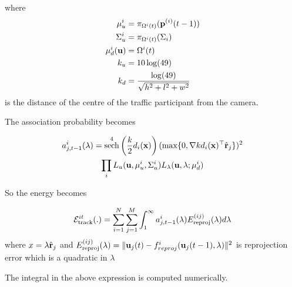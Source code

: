 \documentclass[10pt,twocolumn,letterpaper]{article}
\DeclareMathOperator{\sech}{sech}
\begin{document}
where 
\begin{align}
  \mu_u^i &= \pi_{\Omega^{i}(t)}(\mathbf{p}^{(i)}(t-1)) \\
  \Sigma_u^i &= \pi_{\Omega^{i}(t)}(\Sigma_i)\\
  \mu^i_d(\mathbf{u}) &= \Omega^{i}(t)\\
  k_u &= 10\log(49)\\
  k_d &= \frac{\log(49)}{\sqrt{h^2 + l^2 + w^2}}
  \label{eq:ptransmissionInit}
\end{align}
is the distance of the centre of the traffic participant from the camera.


The association probability becomes

\newcommand{\Lu}{L_u(\mathbf{u}, \mu^i_u,\Sigma^i_u)}
\newcommand{\Llambda}{L_{\lambda}(\mathbf{u}, \lambda; \mu^i_d)}
\begin{multline}
  \assocP = 
    \sech^4\left(\frac{k}{2}\dishort\right)
    (\max \{ 0, \nabla k\dishort^\top\ray \})^2\\
  \prod_i \Lu
    \Llambda \\
    \label{eq:assocCoeffEval}
\end{multline}

So the energy becomes

\begin{multline}
  \label{eq:integrand}
  \mathcal{E}^{it}_{\text{track}}(.) = 
    \sum_{i = 1}^N
    \sum_{j = 1}^{M}
    \int_1^{\infty}
    a^{i}_{j,t-1}(\lambda)
    E^{(ij)}_{\text{reproj}}(\lambda)
    d\lambda
\end{multline}
where $x = \lambda \hat{\mathbf{r}}_j$ and $E^{(ij)}_{\text{reproj}}(\lambda) = \|\mathbf{u}_j(t) -
f^i_{reproj}(\mathbf{u}_j(t-1), \lambda)\|^2$ is reprojection error which is a
quadratic in $\lambda$

The integral in the above expression is computed numerically.
\end{document}

